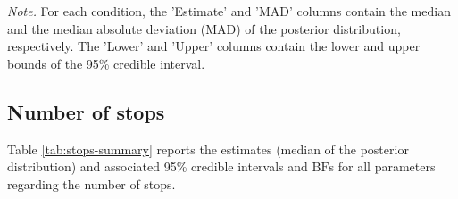 \documentclass[
  11pt,
  english,
  ,doc,floatsintext]{apa6}
\begin{document}
\begin{table}[htb]
\begin{center}
\begin{threeparttable}
{}

\begin{tablenotes}[para]
\normalsize{\textit{Note.} For each condition, the 'Estimate' and 'MAD' columns contain the
    median and the median absolute deviation (MAD) of the posterior distribution,
    respectively. The 'Lower' and 'Upper' columns contain the lower and upper
    bounds of the 95\% credible interval.}
\end{tablenotes}

\end{threeparttable}
\end{center}

\end{table}

\hypertarget{number-of-stops}{%
\subsection{Number of stops}\label{number-of-stops}}

Table \ref{tab:stops-summary} reports the estimates (median of the posterior distribution) and associated 95\% credible intervals and \(\text{BF}\)s for all parameters regarding the number of stops.
\end{document}
